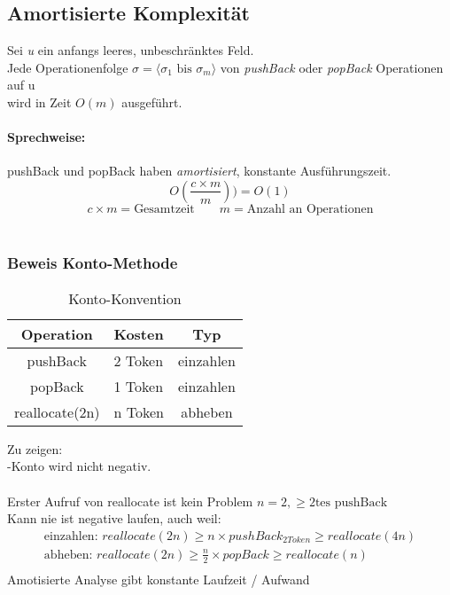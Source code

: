 \documentclass[a4paper]{scrartcl}
\begin{document}
			\subsection{Amortisierte Komplexität}
				Sei \emph{u} ein anfangs leeres, unbeschränktes Feld.\\
				Jede Operationenfolge \emph{\( \sigma = \langle \sigma_1 \text{ bis } \sigma_m \rangle \)} von \emph{pushBack} oder \emph{popBack} Operationen auf u\\
				wird in Zeit \emph{\( O(m) \)} ausgeführt.\\
				\paragraph{Sprechweise:}
					pushBack und popBack haben \emph{amortisiert}, konstante Ausführungszeit.\\
					\[ O( \frac{c \times m}{m}) ) = O(1) \]
					\[ c \times m = \text{Gesamtzeit} \qquad m = \text{Anzahl an Operationen} \]\\
				
		\subsubsection{Beweis Konto-Methode}
			\begin{table}
				\begin{tabular}{ c | l | c}
					Operation & Kosten & Typ \\ \hline
					pushBack & 2 Token & einzahlen \\
					popBack & 1 Token & einzahlen \\
					reallocate(2n) & n Token & abheben\\
				\end{tabular}
				\caption{Konto-Konvention}
			\end{table}
		
			Zu zeigen: \\
			-Konto wird nicht negativ.\\
			\\
			Erster Aufruf von reallocate ist kein Problem \( n=2, \geq 2\text{tes pushBack} \) \\
			Kann nie ist negative laufen, auch weil:\\
			\begin{align*}
				\text{einzahlen: } reallocate(2n) \geq n \times pushBack_{2Token} \geq reallocate(4n)\\
				\text{abheben: } reallocate(2n) \geq \frac{n}{2} \times popBack \geq reallocate(n)\\
			\end{align*}
			Amotisierte Analyse gibt konstante Laufzeit / Aufwand \\
			
\end{document}
